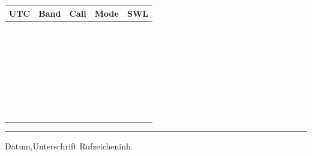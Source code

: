 \documentclass[a4paper,10pt]{article}
\begin{document}
    \clearpage

    \begin{center}
    \renewcommand{\arraystretch}{1.5}
    \begin{tabular}{|c|c|l|c|l|}\hline
        \textbf{UTC} & \textbf{Band} & \textbf{Call} & \textbf{Mode} & \textbf{SWL} \\ \hline \hline
         & & \hspace{2cm} & & \hspace{3.0cm} \\ \hline
         & & & & \\ \hline
         & & & & \\ \hline
         & & & & \\ \hline
         & & & & \\ \hline
         & & & & \\ \hline
         & & & & \\ \hline
         & & & & \\ \hline
         & & & & \\ \hline
         & & & & \\ \hline
         & & & & \\ \hline
         & & & & \\ \hline
         & & & & \\ \hline
         & & & & \\ \hline
         & & & & \\ \hline
         & & & & \\ \hline
         & & & & \\ \hline
         & & & & \\ \hline
         & & & & \\ \hline
         & & & & \\ \hline
         & & & & \\ \hline
         & & & & \\ \hline
         & & & & \\ \hline
         & & & & \\ \hline
         & & & & \\ \hline
         & & & & \\ \hline
         & & & & \\ \hline
         & & & & \\ \hline
         & & & & \\ \hline
         & & & & \\ \hline
         & & & & \\ \hline
         & & & & \\ \hline
    \end{tabular}
    \end{center}

    \vspace{8ex}
    \hfill
    \begin{minipage}[t]{0.35\textwidth}
        \hrule
        \vspace{0.5ex}
        {\small{Datum,}}\hfill{\small{Unterschrift Rufzeicheninh.}}
    \end{minipage}
\end{document}

